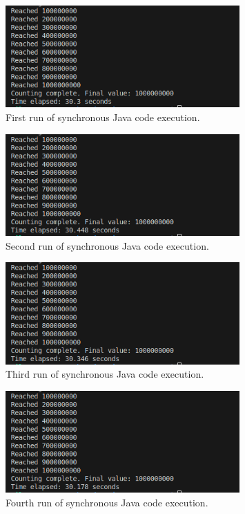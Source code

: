 \documentclass{article}
\begin{document}
\begin{figure}[htbp]
    \centering
    \includegraphics[width=0.8\textwidth]{../records/results_java/result_1.png}
    \caption{First run of synchronous Java code execution.}
    \label{fig:Java-runtime-1}
\end{figure}

\begin{figure}[htbp]
    \centering
    \includegraphics[width=0.8\textwidth]{../records/results_java/result_2.png}
    \caption{Second run of synchronous Java code execution.}
    \label{fig:Java-runtime-2}
\end{figure}

\begin{figure}[htbp]
    \centering
    \includegraphics[width=0.8\textwidth]{../records/results_java/result_3.png}
    \caption{Third run of synchronous Java code execution.}
    \label{fig:Java-runtime-3}
\end{figure}

\begin{figure}[htbp]
    \centering
    \includegraphics[width=0.8\textwidth]{../records/results_java/result_4.png}
    \caption{Fourth run of synchronous Java code execution.}
    \label{fig:Java-runtime-4}
\end{figure}
\end{document}
